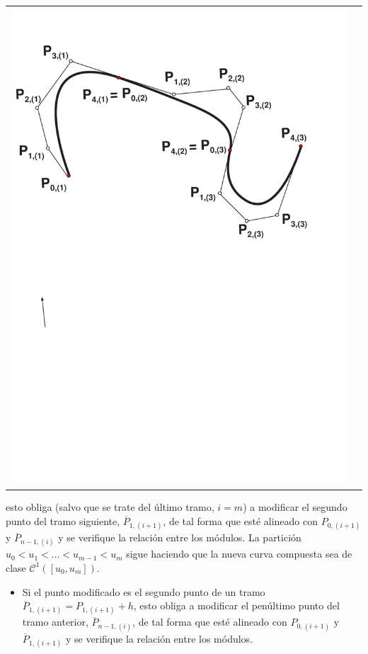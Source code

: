 \documentclass[ebook,oneside]{memoir}
\begin{document}
\begin{center}
\begin{tabular}{cc}
\includegraphics[scale=0.45]{3_22b.pdf}
\end{tabular}
\end{center}

esto obliga (salvo que se trate del \'{u}ltimo tramo, $i=m$) a modificar el segundo punto del tramo siguiente, $\overline{P}_{1,(i+1)}$, de tal forma que est\'{e} alineado con $P_{0,(i+1)}$ y $\overline{P}_{n-1,(i)}$  y se verifique la relaci\'{o}n entre los m\'{o}dulos.
La partici\'{o}n $u_0<u_1<\ldots<u_{m-1}<u_m$ sigue haciendo que la nueva curva compuesta sea de clase ${\mathcal  C}^1([u_0,u_m]).$

\begin{itemize}
\item Si el punto modificado es el segundo punto de un tramo $\overline{P}_{1,(i+1)}=P_{1,(i+1)}+h$, esto obliga a modificar el pen\'{u}ltimo punto del tramo anterior, $\overline{P}_{n-1,(i)}$, de tal forma que est\'{e} alineado con $P_{0,(i+1)}$ y $\overline{P}_{1,(i+1)}$  y se verifique la relaci\'{o}n entre los m\'{o}dulos.
\end{itemize}
\end{document}
